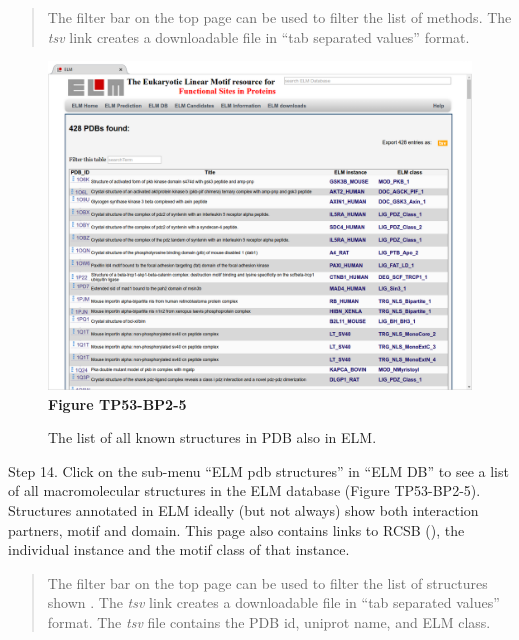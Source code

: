 \begin{quote}
The filter bar on the top page can be used to filter the list of
methods. The \emph{tsv} link creates a downloadable file in ``tab
separated values'' format.
\end{quote}

\begin{figure}[h!]
\centering
\includegraphics[width=\textwidth]{Figures/TP53_2/pdbs.png} \textbf{Figure TP53-BP2-5}
\caption{
The list of all known structures in PDB also in ELM.
}
\end{figure}

Step 14. Click on the sub-menu ``ELM pdb structures'' in ``ELM DB'' to
see a list of all macromolecular structures in the ELM database (Figure
TP53-BP2-5). Structures annotated in ELM ideally (but not always) show
both interaction partners, motif and domain. This page also contains
links to RCSB (\cite{12037327}), the individual instance and the motif
class of that instance.

\begin{quote}
The filter bar on the top page can be used to filter the list of
structures shown . The \emph{tsv} link creates a downloadable file in
``tab separated values'' format. The \emph{tsv} file contains the PDB
id, uniprot name, and ELM class.
\end{quote}

